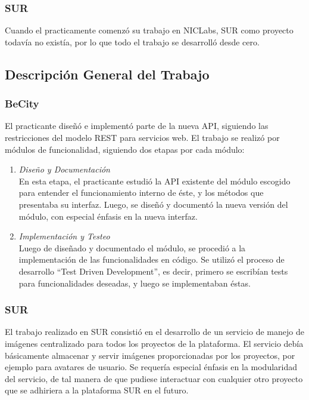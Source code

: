 \documentclass[11pt,letterpaper]{article}
\begin{document}
\subsubsection{SUR}

Cuando el practicamente comenzó su trabajo en NICLabs, SUR como proyecto todavía no existía, por lo que todo el trabajo se desarrolló desde cero.

\subsection{Descripción General del Trabajo}

\subsubsection{BeCity}

El practicante diseñó e implementó parte de la nueva API, siguiendo las restricciones del modelo REST para servicios web. El trabajo se realizó por módulos de funcionalidad, siguiendo dos etapas por cada módulo:
\begin{enumerate}
    \item \emph{Diseño y Documentación} \\ En esta etapa, el practicante estudió la API existente del módulo escogido para entender el funcionamiento interno de éste, y los métodos que presentaba su interfaz. Luego, se diseñó y documentó la nueva versión del módulo, con especial énfasis en la nueva interfaz.
    \item \emph{Implementación y Testeo} \\ Luego de diseñado y documentado el módulo, se procedió a la implementación de las funcionalidades en código. Se utilizó el proceso de desarrollo ``Test Driven Development'', es decir, primero se escribían tests para funcionalidades deseadas, y luego se implementaban éstas.
\end{enumerate}

\subsubsection{SUR}

El trabajo realizado en SUR consistió en el desarrollo de un servicio de manejo de imágenes centralizado para todos los proyectos de la plataforma. El servicio debía básicamente almacenar y servir imágenes proporcionadas por los proyectos, por ejemplo para avatares de usuario. Se requería especial énfasis en la modularidad del servicio, de tal manera de que pudiese interactuar con cualquier otro proyecto que se adhiriera a la plataforma SUR en el futuro.
\end{document}
